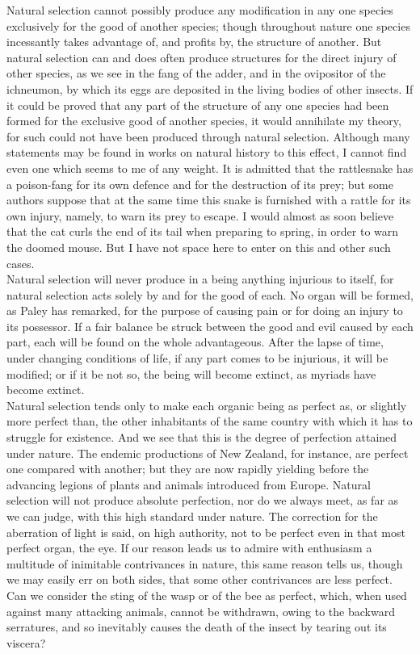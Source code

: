 \indent Natural selection cannot possibly produce any modification in any one species exclusively for the good of another species; though throughout nature one species incessantly takes advantage of, and profits by, the structure of another. But natural selection can and does often produce structures for the direct injury of other species, as we see in the fang of the adder, and in the ovipositor of the ichneumon, by which its eggs are deposited in the living bodies of other insects. If it could be proved that any part of the structure of any one species had been formed for the exclusive good of another species, it would annihilate my theory, for such could not have been produced through natural selection. Although many statements may be found in works on natural history to this effect, I cannot find even one which seems to me of any weight. It is admitted that the rattlesnake has a poison-fang for its own defence and for the destruction of its prey; but some authors suppose that at the same time this snake is furnished with a rattle for its own injury, namely, to warn its prey to escape. I would almost as soon believe that the cat curls the end of its tail when preparing to spring, in order to warn the doomed mouse. But I have not space here to enter on this and other such cases.\\
\indent Natural selection will never produce in a being anything injurious to itself, for natural selection acts solely by and for the good of each. No organ will be formed, as Paley has remarked, for the purpose of causing pain or for doing an injury to its possessor. If a fair balance be struck between the good and evil caused by each part, each will be found on the whole advantageous. After the lapse of time, under changing conditions of life, if any part comes to be injurious, it will be modified; or if it be not so, the being will become extinct, as myriads have become extinct.\\
\indent Natural selection tends only to make each organic being as perfect as, or slightly more perfect than, the other inhabitants of the same country with which it has to struggle for existence. And we see that this is the degree of perfection attained under nature. The endemic productions of New Zealand, for instance, are perfect one compared with another; but they are now rapidly yielding before the advancing legions of plants and animals introduced from Europe. Natural selection will not produce absolute perfection, nor do we always meet, as far as we can judge, with this high standard under nature. The correction for the aberration of light is said, on high authority, not to be perfect even in that most perfect organ, the eye. If our reason leads us to admire with enthusiasm a multitude of inimitable contrivances in nature, this same reason tells us, though we may easily err on both sides, that some other contrivances are less perfect. Can we consider the sting of the wasp or of the bee as perfect, which, when used against many attacking animals, cannot be withdrawn, owing to the backward serratures, and so inevitably causes the death of the insect by tearing out its viscera?\\
